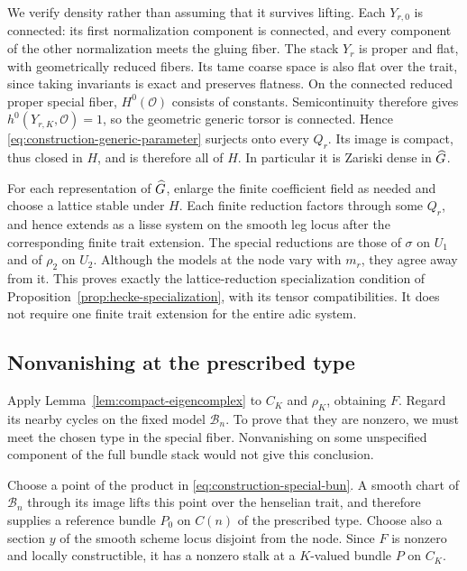 We verify density rather than assuming that it survives lifting.
Each $Y_{r,0}$ is connected: its first normalization component is
connected, and every component of the other normalization meets the
gluing fiber.  The stack $Y_r$ is proper and flat, with geometrically
reduced fibers.  Its tame coarse space is also flat over the trait,
since taking invariants is exact and preserves flatness.  On the
connected reduced proper special fiber, $H^0(\mathcal O)$ consists
of constants.  Semicontinuity therefore gives
$h^0(Y_{r,K},\mathcal O)=1$, so the geometric generic torsor is
connected.  Hence \eqref{eq:construction-generic-parameter} surjects
onto every $Q_r$.  Its image is compact, thus closed in $H$, and is
therefore all of $H$.  In particular it is Zariski dense in $\widehat G$.

For each representation of $\widehat G$, enlarge the finite coefficient field
as needed and choose a lattice stable under $H$.  Each finite
reduction factors through some $Q_r$, and hence extends as a lisse
system on the smooth leg locus after the corresponding finite trait
extension.  The special reductions are those of $\sigma$ on $U_1$
and of $\rho_2$ on $U_2$.  Although the models at the node vary with
$m_r$, they agree away from it.  This proves exactly the
lattice-reduction specialization condition of
Proposition~\ref{prop:hecke-specialization}, with its tensor
compatibilities.  It does not require one finite trait extension for
the entire adic system.

\subsection{Nonvanishing at the prescribed type}
\label{subsec:construction-prescribed-type}

Apply Lemma~\ref{lem:compact-eigencomplex} to $C_K$ and $\rho_K$,
obtaining $F$.  Regard its nearby cycles on the fixed model
$\mathcal B_n$.  To prove that they are nonzero, we must meet the
chosen type in the special fiber.  Nonvanishing on some unspecified
component of the full bundle stack would not give this conclusion.

Choose a point of the product in
\eqref{eq:construction-special-bun}.  A smooth chart of $\mathcal B_n$
through its image lifts this point over the henselian trait, and
therefore supplies a reference bundle $P_0$ on $C(n)$ of the prescribed
type.  Choose also a section $y$ of the smooth scheme locus disjoint
from the node.  Since $F$ is nonzero and locally constructible, it has
a nonzero stalk at a $K$-valued bundle $P$ on $C_K$.

